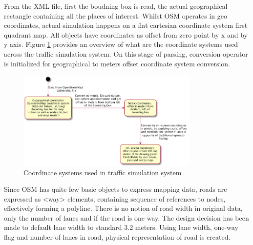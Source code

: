From the XML file, first the boudning box is read, the actual geographical rectangle containing all the places of interest. Whilst OSM operates in geo coordinates, actual simulation happens on a flat cartesian coordinate system first quadrant map. All objects have coordinates as offset from zero point by x and by y axis. Figure \ref{fig:coordinateConversions} provides an overview of what are the coordinate systems used across the traffic simulation system. On this stage of parsing, conversion operator is initialized for geographical to meters offset coordinate system conversion.

\begin{figure}[h]
    \caption{Coordinate systems used in traffic simulation system}
    \label{fig:coordinateConversions}
    \centering
    \includegraphics[width=0.8\textwidth]{../../uml_diagrams/coordinateSystems.png}
\end{figure}

 Since OSM has quite few basic objects to express mapping data, roads are expressed as <way> elements, containing sequence of references to nodes, effectively forming a polyline. There is no notion of road width in original data, only the number of lanes and if the road is one way. The design decision has been made to default lane width to standard 3.2 meters. Using lane width, one-way flag and number of lanes in road, physical representation of road is created.


